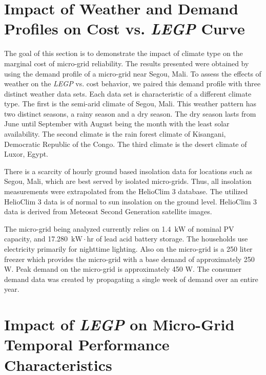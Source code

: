 \documentclass{article}
\newcommand{\unit}[1]{\ensuremath{\, \mathrm{#1}}}
\begin{document}
\section{Impact of Weather and Demand Profiles on Cost vs. \emph{LEGP} Curve}

The goal of this section is to demonstrate the impact of climate type on the marginal cost of micro-grid reliability.
The results presented were obtained by using the demand profile of a micro-grid near Segou, Mali. 
To assess the effects of weather on the \emph{LEGP} vs. cost behavior, we paired this demand profile with three distinct weather data sets. 
Each data set is characteristic of a different climate type. 
The first is the semi-arid climate of Segou, Mali. This weather pattern has two distinct seasons, a rainy season and a dry season.
The dry season lasts from June until September with August being the month with the least solar availability. %
The second climate is the rain forest climate of Kisangani, Democratic Republic of the Congo. %
The third climate is the desert climate of Luxor, Egypt. %

There is a scarcity of hourly ground based insolation data for locations such as Segou, Mali, which are best served by isolated micro-grids. 
Thus, all insolation measurements were extrapolated from the HelioClim 3 database. The utilized HelioClim 3 data is of normal to sun insolation on the ground level.
HelioClim 3 data is derived from Meteosat Second Generation satellite images. 

The micro-grid being analyzed currently relies on 1.4 \unit{kW} of nominal PV capacity, and 17.280 \unit{kW\cdot hr} of lead acid battery storage.
The households use electricity primarily for nighttime lighting.
Also on the micro-grid is a 250 liter freezer which provides the micro-grid with a base demand of approximately 250 W. 
Peak demand on the micro-grid is approximately 450 W. 
The consumer demand data was created by propagating a single week of demand over an entire year.

\section{Impact of \emph{LEGP} on Micro-Grid Temporal Performance Characteristics}

\end{document}
